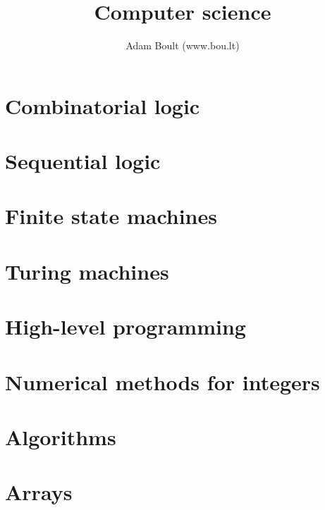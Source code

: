 \documentclass[oneside]{book}
\begin{document}
\author{Adam Boult (www.bou.lt)}
\title{Computer science}
\maketitle

\setcounter{tocdepth}{0}
\tableofcontents



\part{Combinatorial logic}




\part{Sequential logic}



\part{Finite state machines}



\part{Turing machines}







\part{High-level programming}




\part{Numerical methods for integers}





\part{Algorithms}



\part{Arrays}





\end{document}
